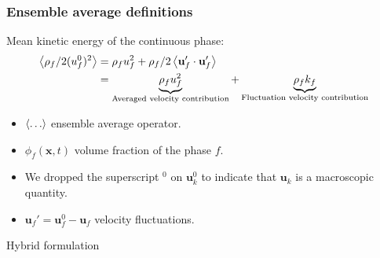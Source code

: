 \documentclass{sintefbeamer}
\begin{document}
\begin{frame}
  \frametitle{Ensemble average definitions}
Mean kinetic energy of the continuous phase: 
\begin{align*}
  \left<\rho_f /2 (u_f^0)^2\right>
  &=
  \rho_f u_f^2
  + 
  \rho_f/2 \left<\textbf{u}_f'\cdot \textbf{u}_f'\right>\\
  &=
  \underbrace{\rho_f u_f^2}_\text{Averaged velocity contribution}
  + 
  \underbrace{\rho_f k_f}_\text{Fluctuation velocity contribution}
\end{align*}


\begin{definition}
  \begin{itemize}
    \item $\left<\ldots\right>$ ensemble average operator. 
    \item  $\phi_f (\textbf{x},t)$ volume fraction of the phase $f$. 
    \item We dropped the superscript $^0$ on $\textbf{u}^0_k$ to indicate that $\textbf{u}_k$ is a macroscopic quantity. 
    \item $\textbf{u}_f' = \textbf{u}_f^0 - \textbf{u}_f$ velocity fluctuations. 
  \end{itemize}
\end{definition}
\end{frame}

\begin{frame}{Hybrid formulation}

\end{frame}
\end{document}
